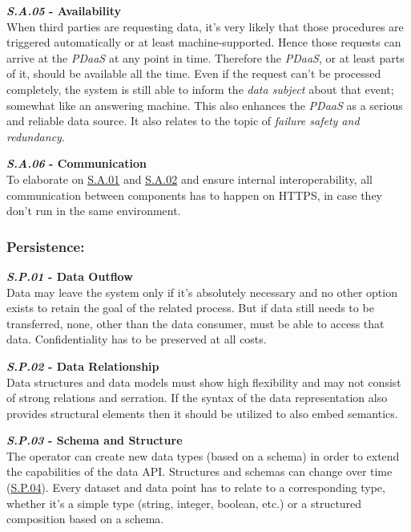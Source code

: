 \documentclass[12pt,english,a4paper,titlepage,cleardoublepage=empty,dottedtoc]{report}
\begin{document}
\textbf{\emph{\protect\hypertarget{sa05}{}{S.A.05}} - Availability}\\
When third parties are requesting data, it's very likely that those
procedures are triggered automatically or at least machine-supported.
Hence those requests can arrive at the \emph{PDaaS} at any point in
time. Therefore the \emph{PDaaS}, or at least parts of it, should be
available all the time. Even if the request can't be processed
completely, the system is still able to inform the \emph{data subject}
about that event; somewhat like an answering machine. This also enhances
the \emph{PDaaS} as a serious and reliable data source. It also relates
to the topic of \emph{failure safety and redundancy}.

\textbf{\emph{\protect\hypertarget{sa06}{}{S.A.06}} - Communication}\\
To elaborate on \protect\hyperlink{sa01}{S.A.01} and
\protect\hyperlink{sa02}{S.A.02} and ensure internal interoperability,
all communication between components has to happen on HTTPS, in case
they don't run in the same environment.

\subsubsection*{Persistence:}\label{persistence}

\textbf{\emph{\protect\hypertarget{sp01}{}{S.P.01}} - Data Outflow}\\
Data may leave the system only if it's absolutely necessary and no other
option exists to retain the goal of the related process. But if data
still needs to be transferred, none, other than the data consumer, must
be able to access that data. Confidentiality has to be preserved at all
costs.

\textbf{\emph{\protect\hypertarget{sp02}{}{S.P.02}} - Data
Relationship}\\
Data structures and data models must show high flexibility and may not
consist of strong relations and serration. If the syntax of the data
representation also provides structural elements then it should be
utilized to also embed semantics.

\textbf{\emph{\protect\hypertarget{sp03}{}{S.P.03}} - Schema and
Structure}\\
The operator can create new data types (based on a schema) in order to
extend the capabilities of the data API. Structures and schemas can
change over time (\protect\hyperlink{sp04}{S.P.04}). Every dataset and
data point has to relate to a corresponding type, whether it's a simple
type (string, integer, boolean, etc.) or a structured composition based
on a schema.
\end{document}
